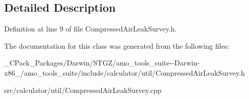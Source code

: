 \subsection{Detailed Description}


Definition at line 9 of file Compressed\+Air\+Leak\+Survey.\+h.



The documentation for this class was generated from the following files\+:\begin{DoxyCompactItemize}
\item 
\+\_\+\+C\+Pack\+\_\+\+Packages/\+Darwin/\+S\+T\+G\+Z/amo\+\_\+tools\+\_\+suite-\/-\/\+Darwin-\/x86\+\_/amo\+\_\+tools\+\_\+suite/include/calculator/util/Compressed\+Air\+Leak\+Survey.\+h\item 
src/calculator/util/Compressed\+Air\+Leak\+Survey.\+cpp\end{DoxyCompactItemize}
